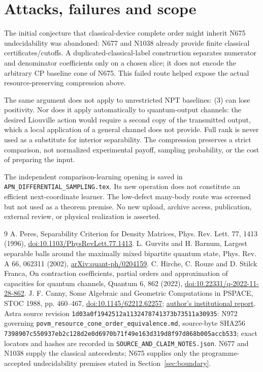 \documentclass[11pt]{article}
\begin{document}
\section{Attacks, failures and scope}
The initial conjecture that classical-device complete order might inherit
N675 undecidability was abandoned: N677 and N1038 already provide finite
classical certificates/cutoffs. A duplicated-classical-label construction
separates numerator and denominator coefficients only on a chosen slice;
it does not encode the arbitrary CP baseline cone of N675. This failed route
helped expose the actual resource-preserving compression above.

The same argument does not apply to unrestricted NPT baselines: (3) can lose
positivity. Nor does it apply automatically to quantum-output channels:
the desired Liouville action would require a second copy of the transmitted
output, which a local application of a general channel does not provide.
Full rank is never used as a substitute for interior separability.
The compression preserves a strict comparison, not normalized experimental
payoff, sampling probability, or the cost of preparing the input.

The independent comparison-learning opening is saved in
\texttt{APN\_DIFFERENTIAL\_SAMPLING.tex}. Its new operation does not constitute
an efficient next-coordinate learner. The low-defect many-body route was
screened but not used as a theorem premise. No new upload, archive access,
publication, external review, or physical realization is asserted.

\begin{thebibliography}{9}
 A. Peres, Separability Criterion for Density Matrices,
Phys. Rev. Lett. 77, 1413 (1996),
\href{https://doi.org/10.1103/PhysRevLett.77.1413}{doi:10.1103/PhysRevLett.77.1413}.
 L. Gurvits and H. Barnum, Largest separable balls around the
maximally mixed bipartite quantum state, Phys. Rev. A 66, 062311 (2002),
\href{https://arxiv.org/abs/quant-ph/0204159}{arXiv:quant-ph/0204159}.
 C. Hirche, C. Rouze and D. Stilck Franca,
On contraction coefficients, partial orders and approximation of capacities
for quantum channels, Quantum 6, 862 (2022),
\href{https://doi.org/10.22331/q-2022-11-28-862}{doi:10.22331/q-2022-11-28-862}.
 J. F. Canny, Some Algebraic and Geometric Computations in
PSPACE, STOC 1988, pp. 460--467,
\href{https://doi.org/10.1145/62212.62257}{doi:10.1145/62212.62257};
\href{https://www2.eecs.berkeley.edu/Pubs/TechRpts/1988/6041.html}{author's institutional report}.
 Astra source revision
\texttt{1d03a0f1942512a1132478741373b73511a30935}:
N972 governing \texttt{povm\_resource\_cone\_order\_equivalence.md},
source-byte SHA256
\texttt{7398907c550937eb2c128d2e0d6970b71f49e163d319d8f97d868b005accb533};
exact locators and hashes are recorded in \texttt{SOURCE\_AND\_CLAIM\_NOTES.json}.
N677 and N1038 supply the classical antecedents; N675 supplies only the
programme-accepted undecidability premises stated in Section~\ref{sec:boundary}.
\end{thebibliography}
\end{document}

